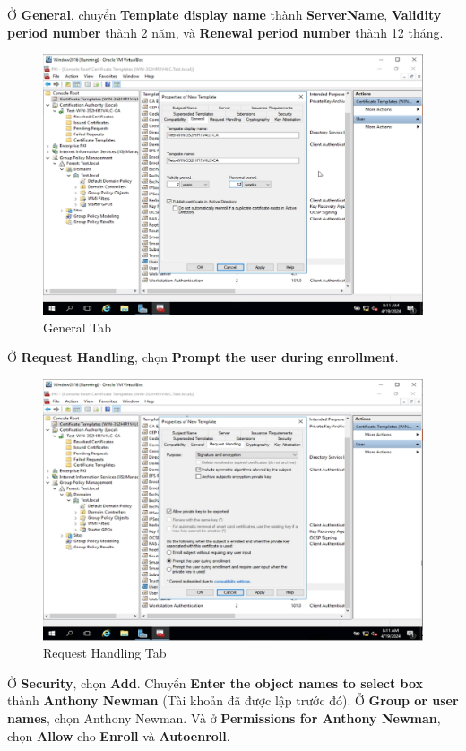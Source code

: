 Ở \textbf{General}, chuyển \textbf{Template display name} thành \textbf{ServerName}, \textbf{Validity period number} thành 2 năm, và \textbf{Renewal period number} thành 12 tháng.

\begin{figure}[!htb]
    \centering
    \includegraphics[width=0.9\linewidth]{figure//chapter4//lab4_3/general_tab.png}
    \caption{General Tab}
    \label{fig:enter-label}
\end{figure}

Ở \textbf{Request Handling}, chọn \textbf{Prompt the user during enrollment}.

\begin{figure}[!htb]
    \centering
    \includegraphics[width=0.9\linewidth]{figure//chapter4//lab4_3/request_handling.png}
    \caption{Request Handling Tab}
    \label{fig:enter-label}
\end{figure}

 Ở \textbf{Security}, chọn \textbf{Add}. Chuyển \textbf{Enter the object names to select box} thành \textbf{Anthony Newman} (Tài khoản đã được lập trước đó). Ở \textbf{Group or user names}, chọn Anthony Newman. Và ở \textbf{Permissions for Anthony Newman}, chọn \textbf{Allow} cho \textbf{Enroll} và \textbf{Autoenroll}.

